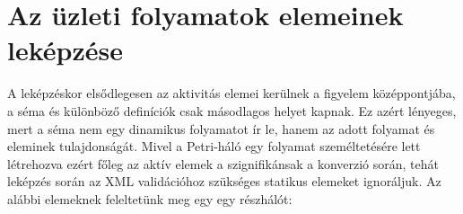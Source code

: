 \documentclass[12pt,a4paper]{book}
\begin{document}
\chapter{Az üzleti folyamatok elemeinek leképzése}



A leképzéskor elsődlegesen az aktivitás elemei kerülnek a figyelem középpontjába, a séma és különböző definíciók csak másodlagos helyet kapnak. Ez azért lényeges, mert a séma nem egy dinamikus folyamatot ír le, hanem az adott folyamat és eleminek tulajdonságát. Mivel a Petri-háló egy folyamat személtetésére lett létrehozva ezért főleg az aktív elemek a szignifikánsak a konverzió során, tehát leképzés során az XML validációhoz szükséges statikus elemeket ignoráljuk.  Az alábbi elemeknek feleltetünk meg egy egy részhálót:
\end{document}
